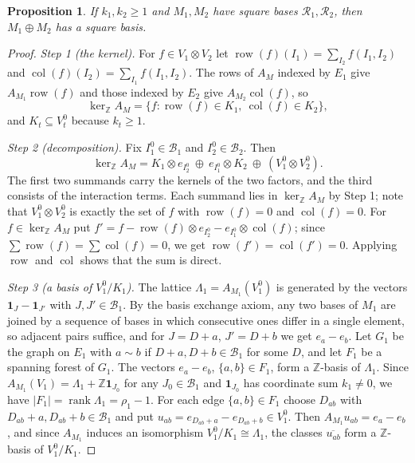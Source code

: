 \documentclass[11pt,a4paper]{article}
\theoremstyle{plain}
\newtheorem{proposition}[theorem]{Proposition}
\theoremstyle{definition}
\newcommand{\Z}{\mathbb Z}
\newcommand{\AM}{A_M}
\newcommand{\kerZ}{\ker_{\Z}\!A_M}
\newcommand{\bs}{\mathcal B}
\newcommand{\rank}{\operatorname{rank}}
\newcommand{\ind}{\mathbf 1}
\begin{document}
\begin{proposition}\label{prop:dsum}
If $k_1,k_2\ge1$ and $M_1,M_2$ have square bases $\mathcal R_1,\mathcal R_2$, then $M_1\oplus M_2$ has a square basis.
\end{proposition}
\begin{proof}
\emph{Step 1 (the kernel).} For $f\in V_1\otimes V_2$ let $\operatorname{row}(f)(I_1)=\sum_{I_2}f(I_1,I_2)$ and $\operatorname{col}(f)(I_2)=\sum_{I_1}f(I_1,I_2)$. The rows of $\AM$ indexed by $E_1$ give $A_{M_1}\operatorname{row}(f)$ and those indexed by $E_2$ give $A_{M_2}\operatorname{col}(f)$, so
\[
\kerZ=\{f:\operatorname{row}(f)\in K_1,\ \operatorname{col}(f)\in K_2\},
\]
and $K_t\subseteq V_t^0$ because $k_t\ge1$.

\emph{Step 2 (decomposition).} Fix $I_1^0\in\bs_1$ and $I_2^0\in\bs_2$. Then
\[
\kerZ=K_1\otimes e_{I_2^0}\ \oplus\ e_{I_1^0}\otimes K_2\ \oplus\ (V_1^0\otimes V_2^0).
\]
The first two summands carry the kernels of the two factors, and the third consists of the interaction terms. Each summand lies in $\kerZ$ by Step 1; note that $V_1^0\otimes V_2^0$ is exactly the set of $f$ with $\operatorname{row}(f)=0$ and $\operatorname{col}(f)=0$. For $f\in\kerZ$ put $f'=f-\operatorname{row}(f)\otimes e_{I_2^0}-e_{I_1^0}\otimes\operatorname{col}(f)$; since $\sum\operatorname{row}(f)=\sum\operatorname{col}(f)=0$, we get $\operatorname{row}(f')=\operatorname{col}(f')=0$. Applying $\operatorname{row}$ and $\operatorname{col}$ shows that the sum is direct.

\emph{Step 3 (a basis of $V_1^0/K_1$).} The lattice $\Lambda_1=A_{M_1}(V_1^0)$ is generated by the vectors $\ind_J-\ind_{J'}$ with $J,J'\in\bs_1$. By the basis exchange axiom, any two bases of $M_1$ are joined by a sequence of bases in which consecutive ones differ in a single element, so adjacent pairs suffice, and for $J=D+a$, $J'=D+b$ we get $e_a-e_b$. Let $G_1$ be the graph on $E_1$ with $a\sim b$ if $D+a,D+b\in\bs_1$ for some $D$, and let $F_1$ be a spanning forest of $G_1$. The vectors $e_a-e_b$, $\{a,b\}\in F_1$, form a $\Z$-basis of $\Lambda_1$. Since $A_{M_1}(V_1)=\Lambda_1+\Z\ind_{J_0}$ for any $J_0\in\bs_1$ and $\ind_{J_0}$ has coordinate sum $k_1\neq0$, we have $|F_1|=\rank\Lambda_1=\rho_1-1$. For each edge $\{a,b\}\in F_1$ choose $D_{ab}$ with $D_{ab}+a,D_{ab}+b\in\bs_1$ and put $u_{ab}=e_{D_{ab}+a}-e_{D_{ab}+b}\in V_1^0$. Then $A_{M_1}u_{ab}=e_a-e_b$, and since $A_{M_1}$ induces an isomorphism $V_1^0/K_1\cong\Lambda_1$, the classes $\overline{u_{ab}}$ form a $\Z$-basis of $V_1^0/K_1$.


\end{proof}
\end{document}
